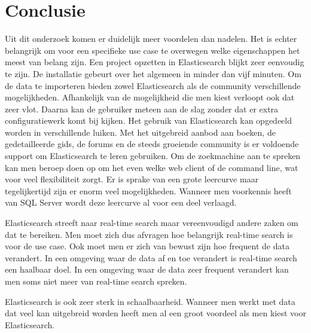 
\chapter{Conclusie}
\label{ch:conclusie}


Uit dit onderzoek komen er duidelijk meer voordelen dan nadelen. Het is echter belangrijk om voor een specifieke use case te overwegen welke eigenschappen het meest van belang zijn. Een project opzetten in Elasticsearch blijkt zeer eenvoudig te zijn. De installatie gebeurt over het algemeen in minder dan vijf minuten. Om de data te importeren bieden zowel Elasticsearch als de community verschillende mogelijkheden. Afhankelijk van de mogelijkheid die men kiest verloopt ook dat zeer vlot. Daarna kan de gebruiker meteen aan de slag zonder dat er extra configuratiewerk komt bij kijken. Het gebruik van Elasticsearch kan opgedeeld worden in verschillende luiken. Met het uitgebreid aanbod aan boeken, de gedetailleerde gids, de forums en de steeds groeiende community is er voldoende support om Elasticsearch te leren gebruiken. Om de zoekmachine aan te spreken kan men beroep doen op om het even welke web client of de command line, wat voor veel flexibiliteit zorgt. Er is sprake van een grote leercurve maar tegelijkertijd zijn er enorm veel mogelijkheden. Wanneer men voorkennis heeft van SQL Server wordt deze leercurve al voor een deel verlaagd.

Elasticsearch streeft naar real-time search maar vereenvoudigd andere zaken om dat te bereiken. Men moet zich dus afvragen hoe belangrijk real-time search is voor de use case. Ook moet men er zich van bewust zijn hoe frequent de data verandert. In een omgeving waar de data af en toe verandert is real-time search een haalbaar doel. In een omgeving waar de data zeer frequent verandert kan men soms niet meer van real-time search spreken.

Elasticsearch is ook zeer sterk in schaalbaarheid. Wanneer men werkt met data dat veel kan uitgebreid worden heeft men al een groot voordeel als men kiest voor Elasticsearch.

